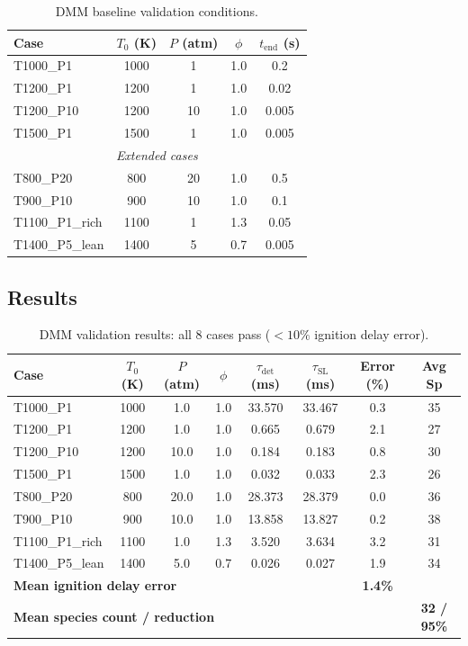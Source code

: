 \documentclass[11pt,a4paper]{article}
\begin{document}
\begin{table}[H]
\centering
\caption{DMM baseline validation conditions.}
\label{tab:dmm_cases}
\begin{tabular}{lcccc}
\toprule
\textbf{Case} & \textbf{$T_0$ (K)} & \textbf{$P$ (atm)} & \textbf{$\phi$} & \textbf{$t_{\text{end}}$ (s)} \\
\midrule
T1000\_P1 & 1000 & 1 & 1.0 & 0.2 \\
T1200\_P1 & 1200 & 1 & 1.0 & 0.02 \\
T1200\_P10 & 1200 & 10 & 1.0 & 0.005 \\
T1500\_P1 & 1500 & 1 & 1.0 & 0.005 \\
\midrule
\multicolumn{5}{c}{\textit{Extended cases}} \\
\midrule
T800\_P20 & 800 & 20 & 1.0 & 0.5 \\
T900\_P10 & 900 & 10 & 1.0 & 0.1 \\
T1100\_P1\_rich & 1100 & 1 & 1.3 & 0.05 \\
T1400\_P5\_lean & 1400 & 5 & 0.7 & 0.005 \\
\bottomrule
\end{tabular}
\end{table}

\subsection{Results}

\begin{table}[H]
\centering
\caption{DMM validation results: all 8 cases pass ($<10\%$ ignition delay error).}
\label{tab:dmm_results}
\begin{tabular}{lccccccc}
\toprule
\textbf{Case} & \textbf{$T_0$ (K)} & \textbf{$P$ (atm)} & \textbf{$\phi$} & \textbf{$\tau_{\text{det}}$ (ms)} & \textbf{$\tau_{\text{SL}}$ (ms)} & \textbf{Error (\%)} & \textbf{Avg Sp} \\
\midrule
T1000\_P1      & 1000 &  1.0 & 1.0 & 33.570 & 33.467 & 0.3 & 35 \\
T1200\_P1      & 1200 &  1.0 & 1.0 &  0.665 &  0.679 & 2.1 & 27 \\
T1200\_P10     & 1200 & 10.0 & 1.0 &  0.184 &  0.183 & 0.8 & 30 \\
T1500\_P1      & 1500 &  1.0 & 1.0 &  0.032 &  0.033 & 2.3 & 26 \\
T800\_P20      &  800 & 20.0 & 1.0 & 28.373 & 28.379 & 0.0 & 36 \\
T900\_P10      &  900 & 10.0 & 1.0 & 13.858 & 13.827 & 0.2 & 38 \\
T1100\_P1\_rich & 1100 &  1.0 & 1.3 &  3.520 &  3.634 & 3.2 & 31 \\
T1400\_P5\_lean & 1400 &  5.0 & 0.7 &  0.026 &  0.027 & 1.9 & 34 \\
\midrule
\multicolumn{6}{l}{\textbf{Mean ignition delay error}} & \textbf{1.4\%} & \\
\multicolumn{6}{l}{\textbf{Mean species count / reduction}} & & \textbf{32 / 95\%} \\
\bottomrule
\end{tabular}
\end{table}
\end{document}
